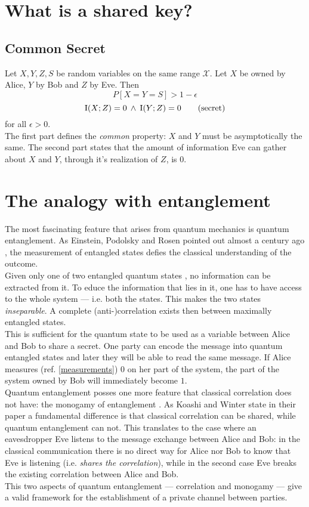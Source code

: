 \section{What is a shared key?}
    	\subsection{Common Secret} \label{commonsecret}%
	Let $X,Y,Z,S$ be random variables on the same range $\mathcal{X}$. Let $X$ be owned by Alice, $Y$ by Bob and $Z$ by Eve. Then
  \begin{equation} \label{eq:common}
	  P[X=Y=S] > 1 - \epsilon \tag{common}
	\end{equation}
	\begin{equation} \label{eq:secret}
	  \operatorname{I}(X;Z) = 0 \: \wedge \: \operatorname{I}(Y;Z) = 0 \tag{secret}
  \end{equation}
for all $\epsilon > 0 $. \\
The first part defines the \textit{common} property: $X$ and $Y$ must be asymptotically the same. 
The second part states that the amount of information Eve can gather about $X$ and $Y$, through it's realization of $Z$, is $0$.
\section{The analogy with entanglement}
	The most fascinating feature that arises from quantum mechanics is quantum entanglement. As Einstein, Podolsky and Rosen pointed out almost a century ago \cite{einstein1935}, 
	the measurement of entangled states defies the classical understanding of the outcome. \\
	Given only one of two entangled quantum states \footnotemark ,  no information can be extracted from it. 
	To educe the information that lies in it, one has to have access to the whole system --- i.e. both the states. 
	This makes the two states \emph{inseparable}. 
	A complete (anti-)correlation exists then between maximally entangled states.\\
	 This is sufficient for the quantum state to be used as a variable between Alice and Bob to share a secret. 
	 One party can encode the message into quantum entangled states and later they will be able to read the same message.
	If Alice measures (ref. \ref{measurements}) $0$ on her part of the system, the part of the system owned by Bob will immediately become $1$.\\
	Quantum entanglement posses one more feature that classical correlation does not have: the monogamy of entanglement \cite{KW04}. 
	As Koashi and Winter state in their paper a fundamental difference is that classical correlation can be shared, while quantum entanglement can not. 
	This translates to the case where an eavesdropper Eve listens to the message exchange between Alice and Bob: in the classical communication there is no direct way for Alice nor Bob to know that Eve is listening (i.e. \textit{shares the correlation}), while in the second case Eve breaks the existing correlation between Alice and Bob.\\
This two aspects of quantum entanglement --- correlation and monogamy --- give a valid framework for the establishment of a private channel between parties.
	
